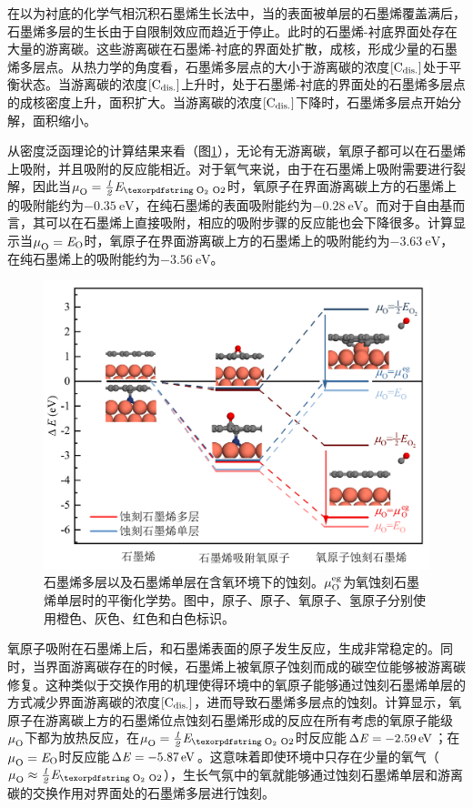 在以为衬底的化学气相沉积石墨烯生长法中，当的表面被单层的石墨烯覆盖满后，石墨烯多层的生长由于自限制效应而趋近于停止。此时的石墨烯-衬底界面处存在大量的游离碳。这些游离碳在石墨烯-衬底的界面处扩散，成核，形成少量的石墨烯多层点。从热力学的角度看，石墨烯多层点的大小于游离碳的浓度$\rm{\left[C_{dis.}\right]} \it$处于平衡状态。当游离碳的浓度$\rm{\left[C_{dis.}\right]} \it$上升时，处于石墨烯-衬底的界面处的石墨烯多层点的成核密度上升，面积扩大。当游离碳的浓度$\rm{\left[C_{dis.}\right]} \it$下降时，石墨烯多层点开始分解，面积缩小。

从密度泛函理论的计算结果来看（图\ref{fig:FLG_DFT_Oetch}），无论有无游离碳，氧原子都可以在石墨烯上吸附，并且吸附的反应能相近。对于氧气来说，由于在石墨烯上吸附需要进行裂解，因此当$\muO{}=\halfEOm$时，氧原子在界面游离碳上方的石墨烯上的吸附能约为$\SI{-0.35}{\electronvolt}$，在纯石墨烯的表面吸附能约为$\SI{-0.28}{\electronvolt}$。而对于自由基而言，其可以在石墨烯上直接吸附，相应的吸附步骤的反应能也会下降很多。计算显示当$\it \mu_{\rm O}^{\rm } \it=\it E_{\rm O} \it$时，氧原子在界面游离碳上方的石墨烯上的吸附能约为$\SI{-3.63}{\electronvolt}$，在纯石墨烯上的吸附能约为$\SI{-3.56}{\electronvolt}$。

\begin{figure}[htb]
    \includegraphics{pic/FLG_DFT_Oetch.png}
    \caption{石墨烯多层以及石墨烯单层在含氧环境下的蚀刻。$\it \mu_{\rm O}^{\rm eg} \it$为氧蚀刻石墨烯单层时的平衡化学势。图中，原子、原子、氧原子、氢原子分别使用橙色、灰色、红色和白色标识。}
    \label{fig:FLG_DFT_Oetch}
\end{figure}

氧原子吸附在石墨烯上后，和石墨烯表面的原子发生反应，生成非常稳定的。同时，当界面游离碳存在的时候，石墨烯上被氧原子蚀刻而成的碳空位能够被游离碳修复。这种类似于交换作用的机理使得环境中的氧原子能够通过蚀刻石墨烯单层的方式减少界面游离碳的浓度$\rm{\left[C_{dis.}\right]} \it$，进而导致石墨烯多层点的蚀刻。计算显示，氧原子在游离碳上方的石墨烯位点蚀刻石墨烯形成的反应在所有考虑的氧原子能级$\it \mu_{\rm O}^{\rm } \it$下都为放热反应，在$\muO{}=\halfEOm$时反应能$\rm{\Delta} \it E=\SI{-2.59}{\electronvolt}$；在$\it \mu_{\rm O}^{\rm } \it=\it E_{\rm O} \it$时反应能$\rm{\Delta} \it E=\SI{-5.87}{\electronvolt}$。这意味着即使环境中只存在少量的氧气（$\muO{} \approx \halfEOm$），生长气氛中的氧就能够通过蚀刻石墨烯单层和游离碳的交换作用对界面处的石墨烯多层进行蚀刻。

